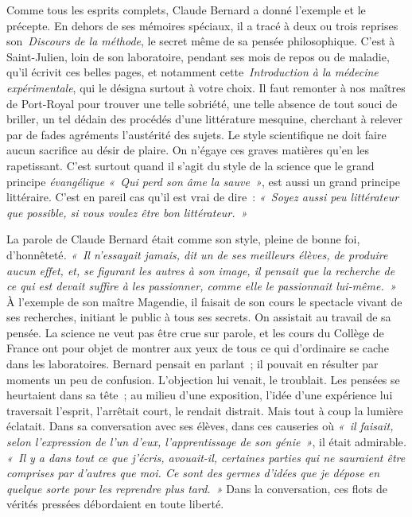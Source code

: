 \documentclass[french,twoside]{book} %
\newcommand\orgName[1]{#1}
\newcommand\persName[1]{#1}
\newcommand\placeName[1]{#1}
\begin{document}
Comme tous les esprits complets, {\persName Claude Bernard} a donné l’exemple et le précepte. En dehors de ses mémoires spéciaux, il a tracé à deux ou trois reprises son \emph{Discours de la méthode}, le secret même de sa pensée philosophique. C’est à {\placeName Saint-Julien}, loin de son laboratoire, pendant ses mois de repos ou de maladie, qu’il écrivit ces belles pages, et notamment cette \emph{Introduction à la médecine expérimentale}, qui le désigna surtout à votre choix. Il faut remonter à nos maîtres de Port-Royal pour trouver une telle sobriété, une telle absence de tout souci de briller, un tel dédain des procédés d’une littérature mesquine, cherchant à relever par de fades agréments l’austérité des sujets. Le style scientifique ne doit faire aucun sacrifice au désir de plaire. On n’égaye ces graves matières qu’en les rapetissant. C’est surtout quand il s’agit du style de la science que le grand principe \emph{évangélique « Qui perd son âme la sauve »}, est aussi un grand principe littéraire. C’est en pareil cas qu’il est vrai de dire : \emph{« Soyez aussi peu littérateur que possible, si vous voulez être bon littérateur. »}\par
La parole de {\persName Claude Bernard} était comme son style, pleine de bonne foi, d’honnêteté\emph{. « Il n’essayait jamais, dit un de ses meilleurs élèves, de produire aucun effet, et, se figurant les autres à son image, il pensait que la recherche de ce qui est devait suffire à les passionner, comme elle le passionnait lui-même. »} À l’exemple de son maître {\persName Magendie}, il faisait de son cours le spectacle vivant de ses recherches, initiant le public à tous ses secrets. On assistait au travail de sa pensée. La science ne veut pas être crue sur parole, et les cours du {\orgName Collège de France} ont pour objet de montrer aux yeux de tous ce qui d’ordinaire se cache dans les laboratoires. {\persName Bernard} pensait en parlant ; il pouvait en résulter par moments un peu de confusion. L’objection lui venait, le troublait. Les pensées se heurtaient dans sa tête ; au milieu d’une exposition, l’idée d’une expérience lui traversait l’esprit, l’arrêtait court, le rendait distrait. Mais tout à coup la lumière éclatait. Dans sa conversation avec ses élèves, dans ces causeries où \emph{« il faisait, selon l’expression de l’un d’eux, l’apprentissage de son génie »}, il était admirable\emph{. « Il y a dans tout ce que j’écris, avouait-il, certaines parties qui ne sauraient être comprises par d’autres que moi. Ce sont des germes d’idées que je dépose en quelque sorte pour les reprendre plus tard. »} Dans la conversation, ces flots de vérités pressées débordaient en toute liberté.\par
\end{document}
